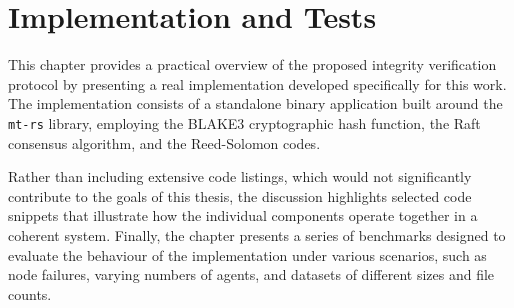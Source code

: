 \chapter{Implementation and Tests}

This chapter provides a practical overview of the proposed integrity
verification protocol by presenting a real implementation developed specifically for this work. The implementation consists of a standalone binary application built around the \texttt{mt-rs} library, employing the BLAKE3 cryptographic hash function, the Raft consensus algorithm, and the Reed-Solomon codes.

Rather than including extensive code listings, which would not significantly contribute to the goals of this thesis, the discussion highlights selected code snippets that illustrate how the individual components operate together in a coherent system. Finally, the chapter presents a series of benchmarks designed to evaluate the behaviour of the implementation under various scenarios, such as node failures, varying numbers of agents, and datasets of different sizes and file counts.



